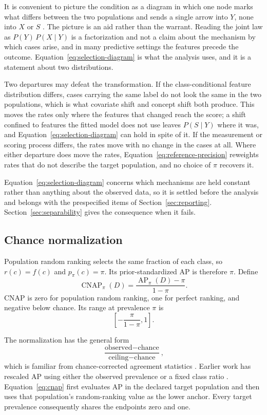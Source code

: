 \documentclass[11pt]{article}
\newcommand{\AP}{\operatorname{AP}}
\newcommand{\CNAP}{\operatorname{CNAP}}
\theoremstyle{remark}
\begin{document}
It is convenient to picture the condition as a diagram in which one node marks what differs between the two populations and sends a single arrow into $Y$, none into $X$ or $S$ \cite{pearl2011transportability,bareinboim2013transportability}. The picture is an aid rather than the warrant. Reading the joint law as $P(Y)\,P(X\mid Y)$ is a factorization and not a claim about the mechanism by which cases arise, and in many predictive settings the features precede the outcome. Equation~\eqref{eq:selection-diagram} is what the analysis uses, and it is a statement about two distributions.

Two departures may defeat the transformation. If the class-conditional feature distribution differs, cases carrying the same label do not look the same in the two populations, which is what covariate shift and concept shift both produce. This moves the rates only where the features that changed reach the score; a shift confined to features the fitted model does not use leaves $P(S\mid Y)$ where it was, and Equation~\eqref{eq:selection-diagram} can hold in spite of it. If the measurement or scoring process differs, the rates move with no change in the cases at all. Where either departure does move the rates, Equation~\eqref{eq:reference-precision} reweights rates that do not describe the target population, and no choice of $\pi$ recovers it.

Equation~\eqref{eq:selection-diagram} concerns which mechanisms are held constant rather than anything about the observed data, so it is settled before the analysis and belongs with the prespecified items of Section~\ref{sec:reporting}. Section~\ref{sec:separability} gives the consequence when it fails.

\subsection{Chance normalization}

Population random ranking selects the same fraction of each class, so $r(c)=f(c)$ and $p_\pi(c)=\pi$. Its prior-standardized AP is therefore $\pi$. Define
\begin{equation}
\CNAP_\pi(D)
=
\frac{\AP_\pi(D)-\pi}{1-\pi}.
\label{eq:cnap}
\end{equation}
CNAP is zero for population random ranking, one for perfect ranking, and negative below chance. Its range at prevalence $\pi$ is
\[
\left[-\frac{\pi}{1-\pi},1\right].
\]

The normalization has the general form
\[
\frac{\text{observed}-\text{chance}}
{\text{ceiling}-\text{chance}},
\]
which is familiar from chance-corrected agreement statistics \cite{cohen1960coefficient}. Earlier work has rescaled AP using either the observed prevalence or a fixed class ratio \cite{suyuan2015relationship,bestgen2021fisher}. Equation~\eqref{eq:cnap} first evaluates AP in the declared target population and then uses that population's random-ranking value as the lower anchor. Every target prevalence consequently shares the endpoints zero and one.
\end{document}
